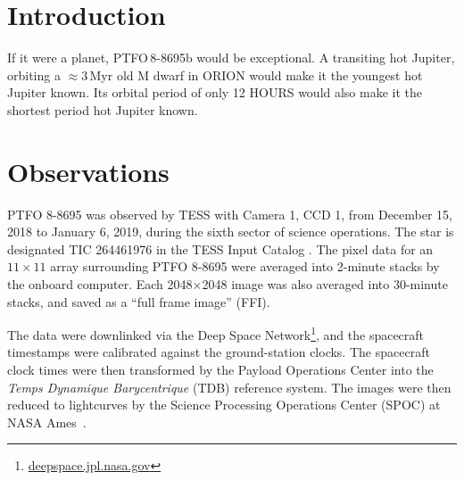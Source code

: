 \documentclass[12pt,twocolumn,tighten]{aastex62}
\begin{document}
\keywords{}


\section{Introduction}
If it were a planet, PTFO$\,$8-8695b would be exceptional.
A transiting hot Jupiter, orbiting a $\approx$3$\,$Myr old M dwarf
in ORION would make it the youngest hot Jupiter known.
Its orbital period of only 12 HOURS would also make it the shortest
period hot Jupiter known.


\section{Observations}
\label{sec:observations}


PTFO 8-8695 was observed by TESS with Camera 1, CCD 1, from December
15, 2018 to January 6, 2019, during the sixth sector of science
operations.  The star is designated TIC 264461976 in the TESS Input
Catalog \citep{stassun_TIC_2018}.  The pixel data for an $11\times11$
array surrounding PTFO 8-8695 were averaged into 2-minute stacks by
the onboard computer. 
Each 2048$\times$2048 image was also averaged into 30-minute stacks,
and saved as a ``full frame image'' (FFI).

The data were downlinked via the Deep Space
Network\footnote{\url{deepspace.jpl.nasa.gov}}, and the
spacecraft timestamps were calibrated against the ground-station
clocks.  The spacecraft clock times were then transformed by the
Payload Operations Center into the {\it Temps Dynamique Barycentrique}
(TDB) reference system.  The images were then reduced to lightcurves
by the Science Processing Operations Center (SPOC) at NASA
Ames~\citep{jenkins_tess_2016}. 
\end{document}
